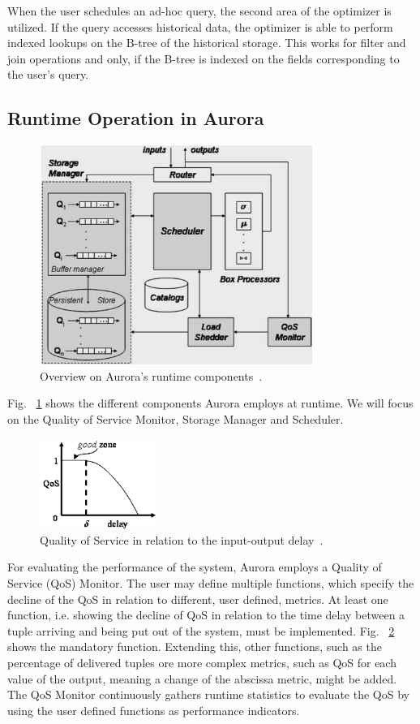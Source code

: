 When the user schedules an ad-hoc query, the second area of the optimizer is utilized. If the query accesses historical data, the optimizer is able to perform indexed lookups on the B-tree of the historical storage. This works for filter and join operations and only, if the B-tree is indexed on the fields corresponding to the user's query.

\subsection{Runtime Operation in Aurora}\label{auroraRuntime}

\begin{figure}[!t]
\centering
\includegraphics[width=3.5in]{./img/AuroraRuntime.png}
\caption{Overview on Aurora's runtime components~\cite{Aurora2003}.}
\label{fig_aurora_runtime}
\end{figure}

Fig. ~\ref{fig_aurora_runtime} shows the different components Aurora employs at runtime. We will focus on the Quality of Service Monitor, Storage Manager and Scheduler.

\begin{figure}[!t]
\centering
\includegraphics[width=1.5in]{./img/AuroraQoS.png}
\caption{Quality of Service in relation to the input-output delay~\cite{Aurora2003}.}
\label{fig_aurora_qos}
\end{figure}

For evaluating the performance of the system, Aurora employs a Quality of Service (QoS) Monitor. The user may define multiple functions, which specify the decline of the QoS in relation to different, user defined, metrics. At least one function, i.e. showing the decline of QoS in relation to the time delay between a tuple arriving and being put out of the system, must be implemented. Fig. ~\ref{fig_aurora_qos} shows the mandatory function. Extending this, other functions, such as the percentage of delivered tuples ore more complex metrics, such as QoS for each value of the output, meaning a change of the abscissa metric, might be added. The QoS Monitor continuously gathers runtime statistics to evaluate the QoS by using the user defined functions as performance indicators.

